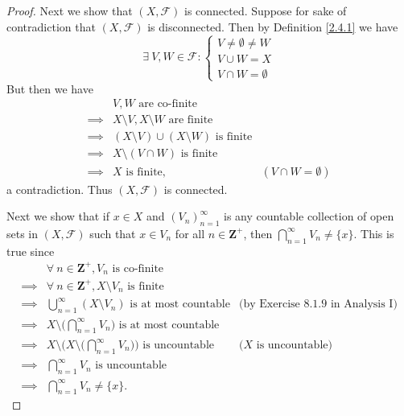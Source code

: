 \begin{proof}
    Next we show that \((X, \mathcal{F})\) is connected.
    Suppose for sake of contradiction that \((X, \mathcal{F})\) is disconnected.
    Then by Definition \ref{2.4.1} we have
    \[
        \exists\ V, W \in \mathcal{F} : \begin{cases}
            V \neq \emptyset \neq W \\
            V \cup W = X            \\
            V \cap W = \emptyset
        \end{cases}
    \]
    But then we have
    \begin{align*}
                 & V, W \text{ are co-finite}                                                      \\
        \implies & X \setminus V, X \setminus W \text{ are finite}                                 \\
        \implies & (X \setminus V) \cup (X \setminus W) \text{ is finite}                          \\
        \implies & X \setminus (V \cap W) \text{ is finite}                                        \\
        \implies & X \text{ is finite},                                   & (V \cap W = \emptyset)
    \end{align*}
    a contradiction.
    Thus \((X, \mathcal{F})\) is connected.

    Next we show that if \(x \in X\) and \((V_n)_{n = 1}^\infty\) is any countable collection of open sets in \((X, \mathcal{F})\) such that \(x \in V_n\) for all \(n \in \mathbf{Z}^+\), then \(\bigcap_{n = 1}^\infty V_n \neq \{x\}\).
    This is true since
    \begin{align*}
                 & \forall\ n \in \mathbf{Z}^+, V_n \text{ is co-finite}                                                                                        \\
        \implies & \forall\ n \in \mathbf{Z}^+, X \setminus V_n \text{ is finite}                                                                               \\
        \implies & \bigcup_{n = 1}^\infty (X \setminus V_n) \text{ is at most countable}                             & \text{(by Exercise 8.1.9 in Analysis I)} \\
        \implies & X \setminus \bigg(\bigcap_{n = 1}^\infty V_n\bigg) \text{ is at most countable}                                                              \\
        \implies & X \setminus \Bigg(X \setminus \bigg(\bigcap_{n = 1}^\infty V_n\bigg)\Bigg) \text{ is uncountable} & \text{(\(X\) is uncountable)}            \\
        \implies & \bigcap_{n = 1}^\infty V_n \text{ is uncountable}                                                                                            \\
        \implies & \bigcap_{n = 1}^\infty V_n \neq \{x\}.
    \end{align*}


\end{proof}
